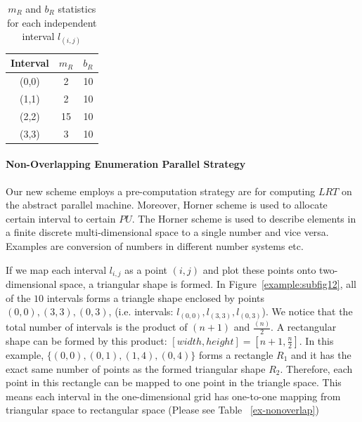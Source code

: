 \documentclass[AMA,LATO1COL]{WileyNJD-v2}
\begin{document}
\begin{table}[t]
\centering \caption{ $m_R$ and $b_R$ statistics for each independent interval $l_(i,j)$\label{tab:op}}
     \begin{tabular}{|c|c|c|}
	\hline
    Interval  &  $m_R$ & $b_R$ \\
	\hline
    (0,0)  &  2 &  10 \\
    \hline
    (1,1)  & 2&  10 \\
    \hline
    (2,2)  &  15& 10 \\
    \hline
     (3,3) & 3  & 10  \\
    \hline
\end{tabular}
\label{lrt-compute}
\end{table}

\paragraph{Non-Overlapping Enumeration Parallel Strategy}

Our new scheme employs a pre-computation strategy are for computing $LRT$  on the abstract parallel machine. Moreover, Horner scheme is used to allocate certain interval to certain $PU$. The Horner scheme is used to describe elements in a finite discrete multi-dimensional space to a single number and vice versa. Examples are conversion of numbers in different number systems etc.

If we map each interval $l_{i,j}$ as a point $(i,j)$ and plot these points onto two-dimensional space, a triangular shape is formed. In Figure~\ref{example:subfig12}, all of the $10$ intervals forms a triangle shape enclosed by points ${(0,0),(3,3),(0,3)}$, (i.e. intervals: ${l_{(0,0)},l_{(3,3)},l_{(0,3)}}$). We notice that the total number of intervals is the product of $(n+1)$ and ${\frac{(n)}{2}}$. A rectangular shape can be formed by this product: $[width,height]=[n+1,{\frac{n}{2}}]$. In this example, $\{{(0,0)},{(0,1)},{(1,4)},{(0,4)}\}$ forms a rectangle $R_1$ and it has the exact same number of points as the formed triangular shape $R_2$. Therefore, each point in this rectangle can be mapped to one point in the triangle space. This means each interval in the one-dimensional grid has one-to-one mapping from triangular space to rectangular space (Please see Table ~\ref{ex-nonoverlap})
\end{document}
